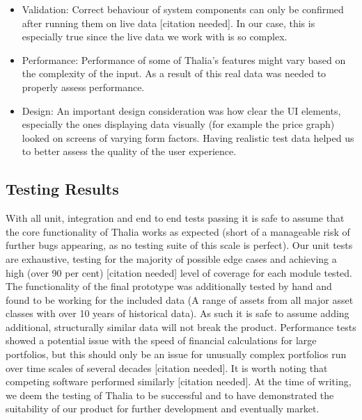 \documentclass[main.tex]{subfiles}
\begin{document}
\begin{itemize}

\item Validation:
Correct behaviour of system components can only be confirmed after running them on live data [citation needed]. In our case, this is especially true since the live data we work with is so complex.

\item Performance:
Performance of some of Thalia's features might vary based on the complexity of the input. As a result of this real data was needed to properly assess performance.

\item Design:
An important design consideration was how clear the UI elements, especially the ones displaying data visually (for example the price graph) looked on screens of varying form factors. Having realistic test data helped us to better assess the quality of the user experience.

\end{itemize}
 

\subsection{Testing Results}

With all unit, integration and end to end tests passing it is safe to assume that the core functionality of Thalia works as expected (short of a manageable risk of further bugs appearing, as no testing suite of this scale is perfect). Our unit tests are exhaustive, testing for the majority of possible edge cases and achieving a high (over 90 per cent) [citation needed] level of coverage for each module tested. The functionality of the final prototype was additionally tested by hand and found to be working for the included data (A range of assets from all major asset classes with over 10 years of historical data). As such it is safe to assume adding additional, structurally similar data will not break the product. 
	Performance tests showed a potential issue with the speed of financial calculations for large portfolios, but this should only be an issue for unusually complex portfolios run over time scales of several decades [citation needed]. It is worth noting that competing software performed similarly [citation needed].
	At the time of writing, we deem the testing of Thalia to be successful and to have demonstrated the suitability of our product for further development and eventually market.
\end{document}
